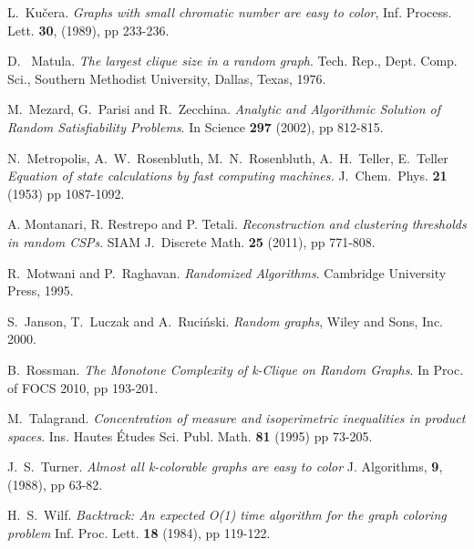 \documentclass[a4paper,10pt]{article}
\newcommand{\Kucera}{Ku\v{c}era}
\begin{document}
\begin{thebibliography}{00}
L.~\Kucera. {\em Graphs with small chromatic number are easy to color},
Inf. Process. Lett. \textbf{30}, (1989), pp 233-236.



 D.~ Matula. 
{\em The largest clique size in a random graph}.
Tech. Rep., Dept. Comp. Sci., Southern Methodist University, Dallas, Texas, 1976.


 M.~Mezard, G.~Parisi and R.~Zecchina. {\em Analytic and Algorithmic 
Solution of Random Satisfiability Problems}. In Science \textbf{297} (2002), pp 812-815.


N.~Metropolis, A.~W.~Rosenbluth, M.~N.~Rosenbluth,  A.~H.~Teller, E.~Teller
{\em Equation of state calculations by fast computing machines.}
J.~Chem.~Phys. \textbf{21} (1953) pp 1087-1092.



 A. Montanari, R. Restrepo and P. Tetali. {\em Reconstruction and
clustering thresholds in random CSPs}. SIAM J.\ Discrete Math.
{\bf 25} (2011), pp 771-808.



 R.~Motwani and P.~Raghavan. {\em Randomized Algorithms}.
Cambridge University Press, 1995.



S.~Janson, T.~Luczak and A.~Ruci\'nski. 
{\em Random graphs},
Wiley and Sons, Inc. 2000.



 B.~Rossman. {\em The Monotone Complexity of k-Clique 
on Random Graphs}. In Proc. of FOCS 2010, pp 193-201. 



 M.~Talagrand.
{\em Concentration of measure and isoperimetric inequalities in product spaces}.
Ins. Hautes \' Etudes Sci. Publ. Math. \textbf{81} 
(1995) pp 73-205.



 J.~S.~Turner. {\em Almost all k-colorable graphs are easy to color}
J. Algorithms, \textbf{9}, (1988), pp 63-82.

H.~S.~Wilf.
{\em Backtrack: An expected O(1) time algorithm for the graph coloring problem}
Inf. Proc. Lett. {\bf 18} (1984), pp 119-122.

\end{thebibliography}
\end{document}
